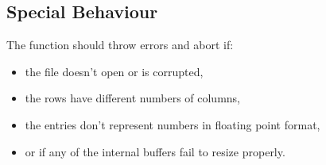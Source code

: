 \subsection{Special Behaviour}
The function should throw errors and abort if: 
\begin{itemize}
\item the file doesn't open or is corrupted,
\item the rows have different numbers of columns,
\item the entries don't represent numbers in floating point format,
\item or if any of the internal buffers fail to resize properly.
\end{itemize}













